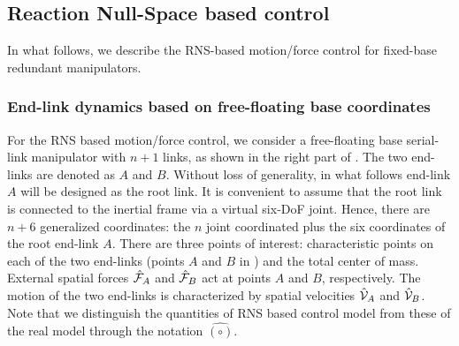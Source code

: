 


\subsection{Reaction Null-Space based control}
In what follows, we describe the RNS-based motion/force control for fixed-base redundant manipulators.

\subsubsection{End-link dynamics based on free-floating base coordinates}
For the RNS based motion/force control,
we consider a free-floating base serial-link manipulator with $n+1$ links, as shown in the right part of .
The two end-links are denoted as $A$ and $B$.
Without loss of generality, in what follows end-link $A$ will be designed as the root link.
It is convenient to assume that the root link is connected to the inertial frame via a virtual six-DoF joint.
Hence, there are $n+6$ generalized coordinates:
the $n$ joint coordinated plus 
the six coordinates of the root end-link $A$.
There are three points of interest:
characteristic points on each of the two end-links (points $A$ and $B$ in )
and the total center of mass.
External spatial forces $\hat{\mathcal{F}}_{A}$ and $\hat{\mathcal{F}}_{B}$ act at points $A$ and $B$, respectively.
The motion of the two end-links is characterized by spatial velocities $\hat{\mathcal{V}}_{A}$ and $\hat{\mathcal{V}}_{B}$.
Note that we distinguish the quantities of RNS based control model from these of the real model
through the notation $\hat{(\circ)}$.

